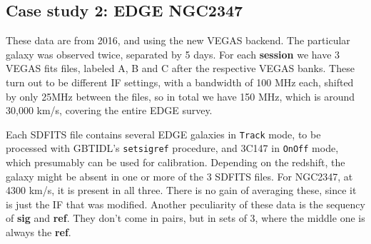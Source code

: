 \documentclass[12pt,a4paper]{article}
\begin{document}
\subsection{Case study 2: EDGE NGC2347}

These data are from 2016, and using the new VEGAS backend. The
particular galaxy was observed twice, separated by 5 days. For each
{\bf session} we have 3 VEGAS fits files, labeled A, B and C after the
respective VEGAS banks. These
turn out to be different IF settings, with a bandwidth of 100 MHz
each, shifted by only 25MHz between the files, so in total we have 150
MHz, which is around 30,000 km/s, covering the entire EDGE survey.

Each SDFITS file contains several EDGE galaxies in {\tt Track}
mode, to be processed with GBTIDL's {\tt setsigref} procedure,
and 3C147 in {\tt OnOff} mode, which presumably can be used for
calibration.  Depending on the redshift, the galaxy might be absent in one
or more of the 3 SDFITS files. For NGC2347, at 4300 km/s, it is present
in all three. There is no gain of averaging these, since it is just the IF
that was modified. Another peculiarity of these data is the sequency of {\bf sig}
and {\bf ref}. They don't come in pairs, but in sets of 3, where the middle one
is always the {\bf ref}.
\end{document}
